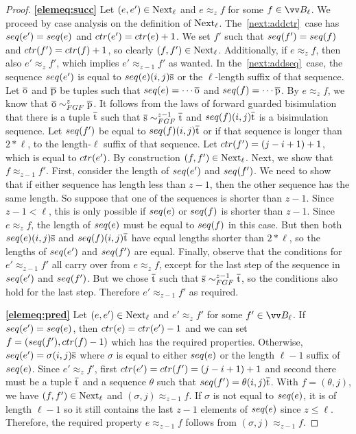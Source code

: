 \begin{proof}
\noindent
\textbf{\ref{elemeq:succ}}
Let $(e, e') \in \mathrm{Next}_{\ell}$ and $e \approx_{z} f$ for some $f \in \unraveldom{B}_{\ell}$.
We proceed by case analysis on the definition of $\mathrm{Next}_{\ell}$.
The~\ref{next:addctr}~case has $\seq{e'} = \seq{e}$ and $\ctr{e'} = \ctr{e} + 1$.
We set $f'$ such that $\seq{f'} = \seq{f}$ and $\ctr{f'} = \ctr{f} + 1$, so clearly $(f, f') \in \mathrm{Next}_{\ell}$.
Additionally, if $e \approx_{z} f$, then also $e' \approx_{z} f'$, which implies $e' \approx_{z-1} f'$ as wanted.
In the~\ref{next:addseq}~case, the sequence $\seq{e'}$ is equal to $\seq{e} (i, j) \elemtuples$ or the $\ell$-length suffix of that sequence.
Let $\overline{\mathrm{o}}$ and $\overline{\mathrm{p}}$ be tuples such that $\seq{e} = \cdots \elemtupleo$ and $\seq{f} = \cdots \elemtuplep$.
By $e \approx_{z} f$, we know that $\elemtupleo \bisimto_{\FGF}^{z} \elemtuplep$.
It follows from the laws of forward guarded bisimulation that there is a tuple $\overline{\mathrm{t}}$ such that $\elemtuples \bisimto_{\FGF}^{z-1} \elemtuplet$ and $\seq{f} (i,j) \elemtuplet$ is a bisimulation sequence.
Let $\seq{f'}$ be equal to $\seq{f} (i,j) \elemtuplet$ or if that sequence is longer than $2 * \ell$, to the length-$\ell$ suffix of that sequence.
Let $\ctr{f'} = (j-i+1) + 1$, which is equal to $\ctr{e'}$.
By construction $(f, f') \in \mathrm{Next}_{\ell}$.
Next, we show that $f \approx_{z-1} f'$.
First, consider the length of $\seq{e'}$ and $\seq{f'}$.
We need to show that if either sequence has length less than $z-1$, then the other sequence has the same length.
So suppose that one of the sequences is shorter than $z-1$.
Since $z - 1 < \ell$, this is only possible if $\seq{e}$ or $\seq{f}$ is shorter than $z-1$.
Since $e \approx_{z} f$, the length of $\seq{e}$ must be equal to $\seq{f}$ in this case.
But then both $\seq{e} (i,j) \elemtuples$ and $\seq{f} (i,j) \elemtuplet$ have equal lengths shorter than $2 * \ell$, so the lengths of $\seq{e'}$ and $\seq{f'}$ are equal.
Finally, observe that the conditions for $e' \approx_{z-1} f'$ all carry over from $e \approx_{z} f$, except for the last step of the sequence in $\seq{e'}$ and $\seq{f'}$.
But we chose $\overline{\mathrm{t}}$ such that $\elemtuples \bisimto_{\FGF}^{z-1} \elemtuplet$, so the conditions also hold for the last step.
Therefore $e' \approx_{z-1} f'$ as required.

\noindent
\textbf{\ref{elemeq:pred}}
Let $(e, e') \in \mathrm{Next}_{\ell}$ and $e' \approx_{z} f'$ for some $f' \in \unraveldom{B}_{\ell}$.
If $\seq{e'} = \seq{e}$, then $\ctr{e} = \ctr{e'} - 1$ and we can set $f = (\seq{f'}, \ctr{f} - 1)$ which has the required properties.
Otherwise, $\seq{e'} = \sigma (i,j) \elemtuples$ where $\sigma$ is equal to either $\seq{e}$ or the length $\ell-1$ suffix of $\seq{e}$.
Since $e' \approx_{z} f'$, first $\ctr{e'} = \ctr{f'} = (j-i+1) + 1$ and second there must be a tuple $\overline{\mathrm{t}}$ and a sequence $\theta$ such that $\seq{f'} = \theta (i,j) \elemtuplet$.
With $f = (\theta, j)$, we have $(f, f') \in \mathrm{Next}_{\ell}$ and $(\sigma, j) \approx_{z-1} f$.
If $\sigma$ is not equal to $\seq{e}$, it is of length $\ell-1$ so it still contains the last $z-1$ elements of $\seq{e}$ since $z \le \ell$.
Therefore, the required property $e \approx_{z-1} f$ follows from $(\sigma, j) \approx_{z-1} f$.
\end{proof}

